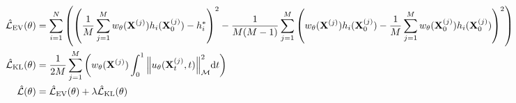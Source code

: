 \documentclass{article}
\theoremstyle{plain}
\theoremstyle{definition}
\theoremstyle{remark}
\begin{document}
\begin{align}
    \hat{\mathcal{L}}_\text{EV}(\theta) & = \sum_{i=1}^{N}\qty(\qty(\frac{1}{M} \sum_{j=1}^M w_\theta(\mathbf{X}^{(j)}) h_i(\mathbf{X}_0^{(j)}) - h_i^*)^2 - 
    \frac{1}{M(M-1)}\sum_{j=1}^M \qty(w_\theta(\mathbf{X}^{(j)}) h_i(\mathbf{X}_0^{(j)}) - \frac{1}{M} \sum_{j=1}^M w_\theta(\mathbf{X}_0^{(j)}) h_i(\mathbf{X}_0^{(j)}))^2) \\
    \hat{\mathcal{L}}_\text{KL}(\theta) & = \frac{1}{2M} \sum_{j=1}^M \qty(w_\theta(\mathbf{X}^{(j)}) \int_0^1 \norm{u_\theta(\mathbf{X}_t^{(j)}, t)}_\mathcal{M}^2 \dd t) \\
    \hat{\mathcal{L}}(\theta) & = \hat{\mathcal{L}}_\text{EV}(\theta) + \lambda \hat{\mathcal{L}}_\text{KL}(\theta)
\end{align}

\end{document}
